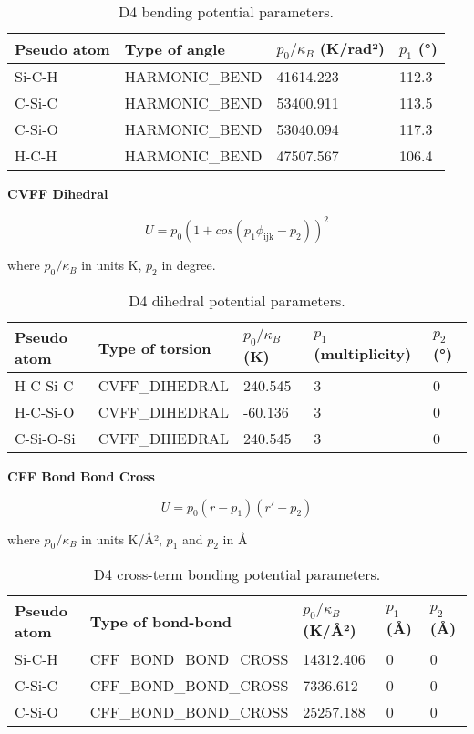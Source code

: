 \begin{table}[H]
    \centering
    \caption{%
        D4 bending potential parameters.
    }\label{tbl:ff-d4-bend}
    \begin{tabular}{@{}llll@{}}
        Pseudo atom & Type of angle & \(p_0 / \kappa_B\) (K/rad²) & \(p_1\) (°) \\
        \midrule
        Si-C-H & HARMONIC\_BEND & 41614.223 & 112.3\\
        C-Si-C & HARMONIC\_BEND & 53400.911 & 113.5\\
        C-Si-O & HARMONIC\_BEND & 53040.094 & 117.3\\
        H-C-H & HARMONIC\_BEND & 47507.567 & 106.4\\
        \bottomrule
    \end{tabular}
\end{table}

\textbf{CVFF Dihedral}

\begin{equation}
    U = p_{0}{(1 + cos(p_{1}\phi_{\text{ijk}} - p_{2}))}^{2}
\end{equation}

where \(p_0 / \kappa_B\) in units K, \(p_2\) in degree. 

\begin{table}[H]
    \centering
    \caption{%
        D4 dihedral potential parameters.
    }\label{tbl:ff-d4-dihedral}
    \begin{tabular}{@{}lllll@{}}
        Pseudo atom & Type of torsion & \(p_0 / \kappa_B\) (K) & \(p_1\) (multiplicity) & \(p_2\) (°) \\
        \midrule
        H-C-Si-C & CVFF\_DIHEDRAL & 240.545 & 3 & 0\\
        H-C-Si-O & CVFF\_DIHEDRAL & -60.136 & 3 & 0\\
        C-Si-O-Si & CVFF\_DIHEDRAL & 240.545 & 3 & 0\\
        \bottomrule
    \end{tabular}
\end{table}

\textbf{CFF Bond Bond Cross}

\begin{equation}
    U = p_{0}(r - p_{1})(r\prime - p_{2})
\end{equation}

where \(p_0 / \kappa_B\) in units K/Å², \(p_1\) and \(p_2\) in Å

\begin{table}[H]
    \centering
    \caption{%
        D4 cross-term bonding potential parameters.
    }\label{tbl:ff-d4-cross-bond}
    \begin{tabular}{@{}lllll@{}}
        Pseudo atom & Type of bond-bond & \(p_0 / \kappa_B\) (K/Å²) & \(p_1\) (Å) & \(p_2\) (Å) \\
        \midrule
        Si-C-H & CFF\_BOND\_BOND\_CROSS & 14312.406 & 0 & 0\\
        C-Si-C & CFF\_BOND\_BOND\_CROSS & 7336.612 & 0 & 0\\
        C-Si-O & CFF\_BOND\_BOND\_CROSS & 25257.188 & 0 & 0\\
        \bottomrule
    \end{tabular}
\end{table}

